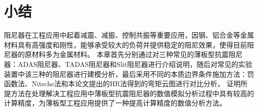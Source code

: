 \section{小结}
阻尼器在工程应用中起着减震、减振、控制共振等重要应用，因钢、铝合金等金属材料具有高强度和刚性，能够承受较大的负荷并提供稳定的阻尼效果，使得目前阻尼器的原材料多为金属材料。
本章首先分别通过对三种常见的薄板型抗震阻尼器：ADAS阻尼器、TADAS阻尼器和Slit阻尼器进行介绍说明，随后对常见的实验装置中该三种的阻尼器进行建模分析，最后采用不同的本质边界条件施加方法：罚函数法、Nitsche法和本论文提出的HR法得到的弯矩云图进行对比分析，
证明所提方法在处理解决工程应用中薄板型抗震阻尼器的数值模拟分析过程中具有较高的计算精度，为薄板型工程应用提供了一种提高计算精度的数值分析方法。

